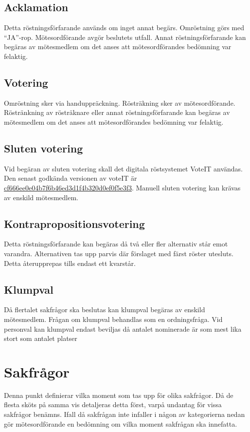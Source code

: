\documentclass[11pt, includeaddress]{classes/cthit}
\begin{document}
\subsection{Acklamation}
Detta röstningsförfarande används om inget annat begärs. Omröstning görs med ``JA''-rop. Mötesordförande avgör beslutets utfall. Annat röstningsförfarande kan begäras av mötesmedlem om det anses att mötesordförandes bedömning var felaktig.
\subsection{Votering}
Omröstning sker via handuppräckning. Rösträkning sker av mötesordförande. Röstränkning av rösträknare eller annat röstningsförfarande kan begäras av mötesmedlem om det anses att mötesordförandes bedömning var felaktig.
\subsection{Sluten votering}
Vid begäran av sluten votering skall det digitala röstsystemet VoteIT användas.
Den senast godkända versionen av voteIT är
\href{https://github.com/cthit/VoteIT/commit/cf666ee0e04b7f6b46ed3d1f4b320d0ef0f5e3f3}{cf666ee0e04b7f6b46ed3d1f4b320d0ef0f5e3f3}.
Manuell sluten votering kan krävas av enskild mötesmedlem.
\subsection{Kontrapropositionsvotering}
Detta röstningsförfarande kan begäras då två eller fler alternativ står emot varandra. Alternativen tas upp parvis där förslaget med färst röster utesluts. Detta återupprepas tills endast ett kvarstår.
\subsection{Klumpval}
Då flertalet sakfrågor ska beslutas kan klumpval begäras av enskild mötesmedlem. Frågan om klumpval behandlas som en ordningsfråga.
Vid personval kan klumpval endast beviljas då antalet nominerade är som mest lika stort som antalet platser

\section{Sakfrågor}
Denna punkt definierar vilka moment som tas upp för olika sakfrågor. Då de flesta sköts på samma vis detaljeras detta först, varpå undantag för vissa sakfrågor benämns.
Ifall då sakfrågan inte infaller i någon av kategorierna nedan gör mötesordförande en bedömning om vilka moment sakfrågan ska innefatta.
\end{document}
